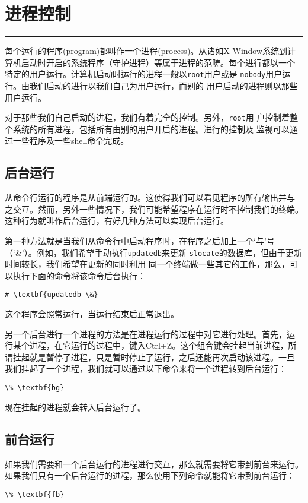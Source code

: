 
\chapter{进程控制}
\label{chap:processControl}
\rule{\textwidth}{0.1pt}

每个运行的程序(program)都叫作一个进程(process)。从诸如X Window系统到计
算机启动时开启的系统程序（守护进程）等属于进程的范畴。每个进行都以一个
特定的用户运行。计算机启动时运行的进程一般以\texttt{root}用户或是
\texttt{nobody}用户运行。由我们启动的进行以我们自己为用户运行，而别的
用户启动的进程则以那些用户运行。

对于那些我们自己启动的进程，我们有着完全的控制。另外，\texttt{root}用
户控制着整个系统的所有进程，包括所有由别的用户开启的进程。进行的控制及
监视可以通过一些程序及一些shell命令完成。

\section{后台运行}
\label{chap:processControl:backgrounding}
从命令行运行的程序是从前端运行的。这使得我们可以看见程序的所有输出并与
之交互。然而，另外一些情况下，我们可能希望程序在运行时不控制我们的终端。
这种行为就叫作后台运行，有好几种方法可以实现后台运行。

第一种方法就是当我们从命令行中启动程序时，在程序之后加上一个`与'号
（`\&'）。例如，我们希望手动执行\texttt{updatedb}来更新
\texttt{slocate}的数据库，但由于更新时间较长，我们希望在更新的同时利用
同一个终端做一些其它的工作，那么，可以执行下面的命令将该命令后台执行：
\begin{Verbatim}[frame=single, commandchars=\\\{\}]
# \textbf{updatedb \&}
\end{Verbatim}
这个程序会照常运行，当运行结束后正常退出。

另一个后台进行一个进程的方法是在进程运行的过程中对它进行处理。首先，运
行某个进程，在它运行的过程中，键入Ctrl+Z。这个组合键会挂起当前进程，所
谓挂起就是暂停了进程，只是暂时停止了运行，之后还能再次启动该进程。一旦
我们挂起了一个进程，我们就可以通过以下命令来将一个进程转到后台运行：
\begin{Verbatim}[frame=single, commandchars=\\\{\}]
\% \textbf{bg}
\end{Verbatim}
现在挂起的进程就会转入后台运行了。

\section{前台运行}
\label{chap:processControl:forgrounding}
如果我们需要和一个后台运行的进程进行交互，那么就需要将它带到前台来运行。
如果我们只有一个后台运行的进程，那么使用下列命令就能将它带到前台运行：
\begin{Verbatim}[frame=single, commandchars=\\\{\}]
\% \textbf{fb}
\end{Verbatim}

